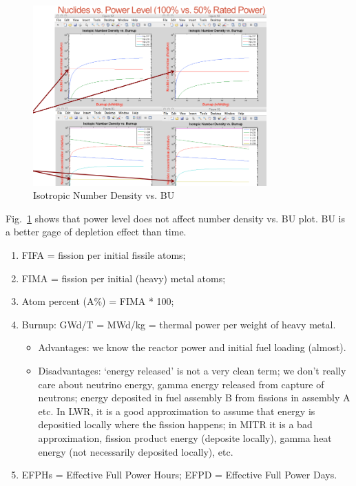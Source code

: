 \documentclass{school-22.211-notes}
\begin{document}
\clearpage
{}
\begin{figure}[h]
  \centering
  \includegraphics[width=0.8\textwidth]{images/dfs/nuclide-vs-power.png}  
  \caption{Isotropic Number Density vs. BU} \label{n-vs-BU} 
\end{figure}
Fig.~\ref{n-vs-BU} shows that power level does not affect number density vs. BU plot. BU is a better gage of depletion effect than time. 

\begin{enumerate}
\item FIFA = fission per initial fissile atoms;
\item FIMA = fission per initial (heavy) metal atoms;
\item Atom percent (A\%) = FIMA * 100;
\item Burnup: GWd/T = MWd/kg = thermal power per weight of heavy metal. 
  \begin{itemize}
    \item Advantages: we know the reactor power and initial fuel loading (almost). 
    \item Disadvantages: `energy released' is not a very clean term; we don't really care about neutrino energy, gamma energy released from capture of neutrons; energy deposited in fuel assembly B from fissions in assembly A etc. In LWR, it is a good approximation to assume that energy is depositied locally where the fission happens; in MITR it is a bad approximation, fission product energy (deposite locally), gamma heat energy (not necessarily deposited locally), etc. 
  \end{itemize}
\item EFPHs = Effective Full Power Hours; EFPD = Effective Full Power Days. 
\end{enumerate}
\end{document}
